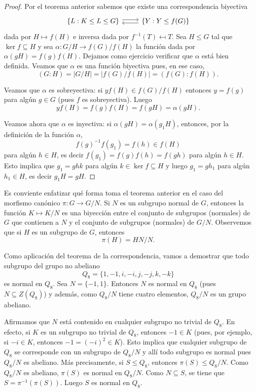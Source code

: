 \begin{proof}
Por el teorema anterior 
sabemos que existe una correspondencia biyectiva
\[
\begin{tikzcd}
	{\{L:K\leq L\leq G\}} & {\{Y:Y\leq f(G)\}}
	\arrow[shift left=1, from=1-1, to=1-2]
	\arrow[shift left=1, from=1-2, to=1-1]
\end{tikzcd}
\]
dada por $H\mapsto f(H)$ e 
inversa dada por $f^{-1}(T)\mapsfrom T$. Sea $H\leq G$ tal que $\ker f\subseteq H$ y sea 
$\alpha\colon G/H\to f(G)/f(H)$ la función dada por $\alpha(gH)=f(g)f(H)$. 
Dejamos como ejercicio verificar que $\alpha$ está bien definida. 
Veamos que $\alpha$ es una función biyectiva pues, en ese caso, 
\[
(G:H)=|G/H|=|f(G)/f(H)|=(f(G):f(H)).
\]

Veamos que $\alpha$ es sobreyectiva: si $yf(H)\in f(G)/f(H)$ entonces
$y=f(g)$ para algún $g\in G$ (pues $f$ es sobreyectiva). Luego 
\[
yf(H)=f(g)f(H)=f(gH)=\alpha(gH).
\]

Veamos ahora que $\alpha$ es inyectiva: si $\alpha(gH)=\alpha(g_1H)$, entonces, por la definición de la función $\alpha$, 
\[
f(g)^{-1}f(g_1)=f(h)\in f(H)
\]
para algún $h\in H$, es decir 
$f(g_1)=f(g)f(h)=f(gh)$ para algún $h\in H$. Esto implica que $g_1=ghk$ para algún $k\in\ker f\subseteq H$ y luego
$g_1=gh_1$ para algún $h_1\in H$, es decir $g_1H=gH$.  
\end{proof}

Es conviente enfatizar qué forma toma el teorema anterior en el caso del morfismo canónico $\pi\colon G\to G/N$.
Si $N$ es un subgrupo normal de $G$, entonces la función $K\mapsto K/N$ es una biyección entre el conjunto de subgrupos (normales) 
de $G$ que contienen a $N$ y el conjunto de subgrupos (normales) de $G/N$. 
Observemos que si $H$ es un subgrupo de $G$, entonces
\[
\pi(H)=HN/N.
\]

\begin{example}
Como aplicación del teorema de la correspondencia, vamos a demostrar que todo subgrupo del grupo no abeliano 
\[
Q_8=\{1,-1,i,-i,j,-j,k,-k\}
\]
es normal en $Q_8$. Sea $N=\{-1,1\}$. Entonces $N$ es normal en $Q_8$ (pues $N\subseteq Z(Q_8)$) y además, como $Q_8/N$ tiene cuatro elementos, $Q_8/N$ es un grupo abeliano.

Afirmamos que $N$ está contenido en cualquier subgrupo no trivial de $Q_8$. En efecto, si 
$K$ es un subgrupo no trivial de $Q_8$, entonces $-1\in K$ (pues, por ejemplo, si $-i\in K$, entonces $-1=(-i)^2\in K$). 
Esto implica que cualquier subgrupo de $Q_8$ se corresponde con un subgrupo de $Q_8/N$ y allí todo subgrupo es normal pues $Q_8/N$ es abeliano. Más precisamente, si 
$S\leq Q_8$, entonces $\pi(S)\leq Q_8/N$. Como $Q_8/N$ es abeliano, $\pi(S)$ es normal en $Q_8/N$. 
Como $N\subseteq S$, se tiene que $S=\pi^{-1}(\pi(S))$. Luego $S$ es normal en $Q_8$.
\end{example}

